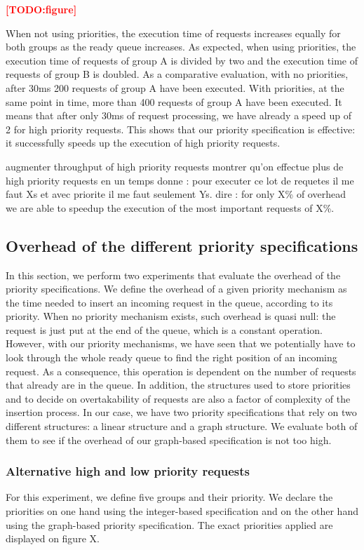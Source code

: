 \documentclass[11pt]{report}
\newcommand{\TODO}[1]{\textcolor{red}{\textbf{[TODO:#1]}}}
\begin{document}
\TODO{figure}

When not using priorities, the execution time of requests increases equally for both groups as the ready queue increases. As expected, when using priorities, the execution time of requests of group A is divided by two and the execution time of requests of group B is doubled. As a comparative evaluation, with no priorities, after 30ms 200 requests of group A have been executed. With priorities, at the same point in time, more than 400 requests of group A have been executed. It means that after only 30ms of request processing, we have already a speed up of 2 for high priority requests. This shows that our priority specification is effective: it successfully speeds up the execution of high priority requests. 

augmenter throughput of high priority requests
montrer qu'on effectue plus de high priority requests en un temps donne : pour executer ce lot de requetes il me faut Xs et avec priorite il me faut seulement Ys.
dire : for only X\% of overhead we are able to speedup the execution of the most important requests of X\%. 


\subsection{Overhead of the different priority specifications}
In this section, we perform two experiments that evaluate the overhead of the priority specifications. We define the overhead of a given priority mechanism as the time needed to insert an incoming request in the queue, according to its priority. When no priority mechanism exists, such overhead is quasi null: the request is just put at the end of the queue, which is a constant operation. However, with our priority mechanisms, we have seen that we potentially have to look through the whole ready queue to find the right position of an incoming request. As a consequence, this operation is dependent on the number of requests that already are in the queue. In addition, the structures used to store priorities and to decide on overtakability of requests are also a factor of complexity of the insertion process. In our case, we have two priority specifications that rely on two different structures: a linear structure and a graph structure. We evaluate both of them to see if the overhead of our graph-based specification is not too high. 

\subsubsection{Alternative high and low priority requests}
For this experiment, we define five groups and their priority. We declare the priorities on one hand using the integer-based specification and on the other hand using the graph-based priority specification. The exact priorities applied are displayed on figure X.
\end{document}
